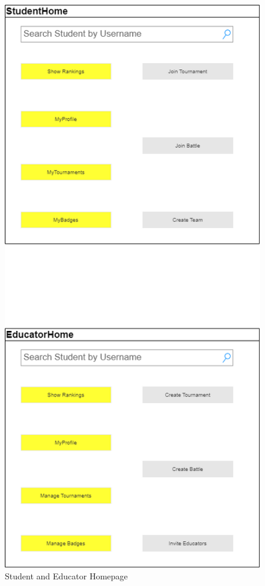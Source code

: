         \begin{figure}[H]
        \centering
        \includegraphics[scale=0.55]{images/interfaces_2.png}
        \caption{Student and Educator Homepage}
        \label{fig:home_pages}
    \end{figure}
    \clearpage
  
